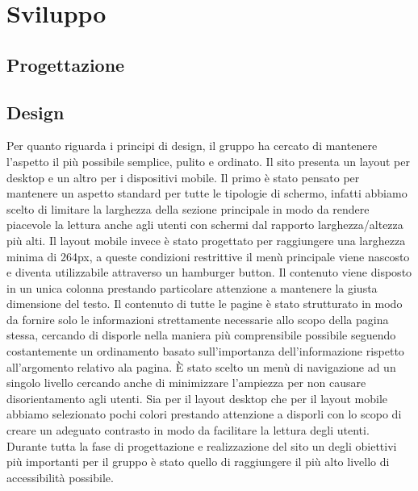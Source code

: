 \section{Sviluppo}

\subsection{Progettazione}

\subsection{Design}
Per quanto riguarda i principi di design, il gruppo ha cercato di mantenere l'aspetto il più possibile semplice, pulito e ordinato. Il sito presenta un layout per desktop e un altro per i dispositivi mobile. Il primo è stato pensato per mantenere un aspetto standard per tutte le tipologie di schermo, infatti abbiamo scelto di limitare la larghezza della sezione principale in modo da rendere piacevole la lettura anche agli utenti con schermi dal rapporto larghezza/altezza più alti. Il layout mobile invece è stato progettato per raggiungere una larghezza minima di 264px, a queste condizioni restrittive il menù principale viene nascosto e diventa utilizzabile attraverso un hamburger button. Il contenuto viene disposto in un unica colonna prestando particolare attenzione a mantenere la giusta dimensione del testo. Il contenuto di tutte le pagine è stato strutturato in modo da fornire solo le informazioni strettamente necessarie allo scopo della pagina stessa, cercando di disporle nella maniera più comprensibile possibile seguendo costantemente un ordinamento basato sull'importanza dell'informazione rispetto all'argomento relativo ala pagina. È stato scelto un menù di navigazione ad un singolo livello cercando anche di minimizzare l'ampiezza per non causare disorientamento agli utenti. Sia per il layout desktop che per il layout mobile abbiamo selezionato pochi colori prestando attenzione a disporli con lo scopo di creare un adeguato contrasto in modo da facilitare la lettura degli utenti. Durante tutta la fase di progettazione e realizzazione del sito un degli obiettivi più importanti per il gruppo è stato quello di raggiungere il più alto livello di accessibilità possibile.
